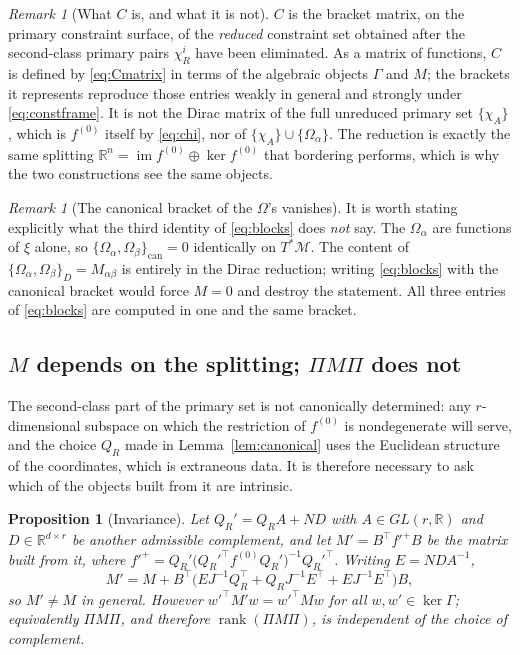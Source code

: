 \documentclass[12pt]{article}
\theoremstyle{plain}
\newtheorem{proposition}[theorem]{Proposition}
\theoremstyle{definition}
\theoremstyle{remark}
\newtheorem{remark}[theorem]{Remark}
\newcommand{\R}{\mathbb{R}}
\DeclareMathOperator{\rank}{rank}
\DeclareMathOperator{\im}{im}
\newcommand{\Om}{\Omega}
\newcommand{\Mm}{\mathcal{M}}
\begin{document}
	\begin{remark}[What $C$ is, and what it is not]
		\label{rem:whatCis}
		$C$ is the bracket matrix, on the primary constraint surface, of the
		\emph{reduced} constraint set obtained after the second-class primary pairs
		$\chi_{R}^{i}$ have been eliminated. As a matrix of functions, $C$ is defined by
		\eqref{eq:Cmatrix} in terms of the algebraic objects $\Gamma$ and $M$; the
		brackets it represents reproduce those entries weakly in general and strongly
		under \eqref{eq:constframe}. It is not
		the Dirac matrix of the full unreduced primary set $\{\chi_{A}\}$, which is
		$f^{(0)}$ itself by \eqref{eq:chi}, nor of $\{\chi_{A}\}\cup\{\Om_{\alpha}\}$.
		The reduction is exactly the same splitting $\R^{n}=\im f^{(0)}\oplus\ker f^{(0)}$
		that bordering performs, which is why the two constructions see the same
		objects.
	\end{remark}
	
	\begin{remark}[The canonical bracket of the $\Om$'s vanishes]
		\label{rem:canvanishes}
		It is worth stating explicitly what the third identity of \eqref{eq:blocks} does
		\emph{not} say. The $\Om_{\alpha}$ are functions of $\xi$ alone, so
		$\{\Om_{\alpha},\Om_{\beta}\}_{\mathrm{can}}=0$ identically on $T^{*}\Mm$. The
		content of $\{\Om_{\alpha},\Om_{\beta}\}_{D}=M_{\alpha\beta}$ is entirely in the
		Dirac reduction; writing \eqref{eq:blocks} with the canonical bracket would
		force $M=0$ and destroy the statement. All three entries of \eqref{eq:blocks}
		are computed in one and the same bracket.
	\end{remark}
	
	\subsection{\texorpdfstring{$M$}{M} depends on the splitting; \texorpdfstring{$\Pi M\Pi$}{Pi M Pi} does not}
	\label{sec:invariance}
	
	The second-class part of the primary set is not canonically determined: any
	$r$-dimensional subspace on which the restriction of $f^{(0)}$ is nondegenerate
	will serve, and the choice $Q_{R}$ made in Lemma~\ref{lem:canonical} uses the
	Euclidean structure of the coordinates, which is extraneous data. It is
	therefore necessary to ask which of the objects built from it are intrinsic.
	
	\begin{proposition}[Invariance]
		\label{prop:invariance}
		Let $Q_{R}'=Q_{R}A+ND$ with $A\in GL(r,\R)$ and $D\in\R^{d\times r}$ be another
		admissible complement, and let $M'=B^{\top}f'^{+}B$ be the matrix built from it,
		where $f'^{+}=Q_{R}'\bigl(Q_{R}'^{\top}f^{(0)}Q_{R}'\bigr)^{-1}Q_{R}'^{\top}$.
		Writing $E=NDA^{-1}$,
		\begin{equation}
			M'=M+B^{\top}\bigl(EJ^{-1}Q_{R}^{\top}+Q_{R}J^{-1}E^{\top}
			+EJ^{-1}E^{\top}\bigr)B,
			\label{eq:Mprime}
		\end{equation}
		so $M'\neq M$ in general. However $w'^{\top}M'w=w'^{\top}Mw$ for all
		$w,w'\in\ker\Gamma$; equivalently $\Pi M\Pi$, and therefore $\rank(\Pi M\Pi)$,
		is independent of the choice of complement.
	\end{proposition}
	
\end{document}
